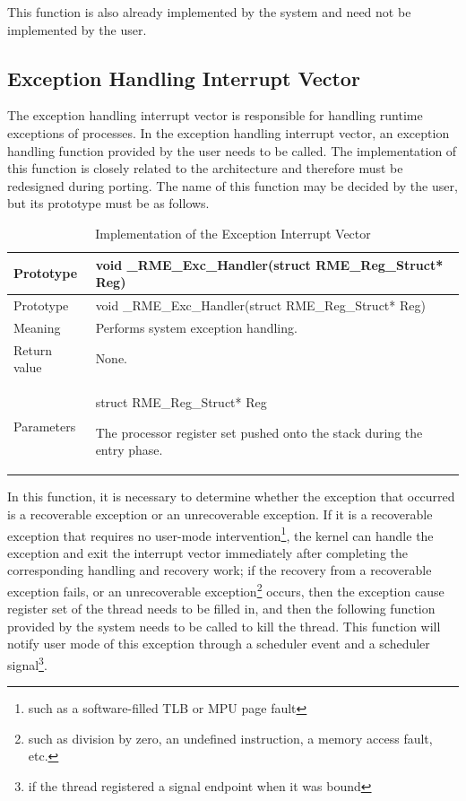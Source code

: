 This function is also already implemented by the system and need not be implemented by the user.

\subsection{Exception Handling Interrupt Vector}\label{subsec:7-exception-handling-interrupt-vector}

The exception handling interrupt vector is responsible for handling runtime exceptions of processes. In the exception handling interrupt vector, an exception handling function provided by the user needs to be called. The implementation of this function is closely related to the architecture and therefore must be redesigned during porting. The name of this function may be decided by the user, but its prototype must be as follows.

\begin{xltabular}{\textwidth}{@{}>{\hsize\raggedright\arraybackslash}X>{\hsize\raggedright\arraybackslash}X@{}}
\caption{Implementation of the Exception Interrupt Vector}\label{tab:7-21-exception-interrupt-vector-implementation}\\
\toprule
Prototype & void \_RME\_Exc\_Handler(struct RME\_Reg\_Struct*
Reg)\tabularnewline
\endfirsthead
\toprule
Prototype & void \_RME\_Exc\_Handler(struct RME\_Reg\_Struct*
Reg)\tabularnewline
\midrule
\endhead
\bottomrule
\endlastfoot
Meaning & Performs system exception handling.\tabularnewline
Return value & None.\tabularnewline
Parameters\strut
 & struct RME\_Reg\_Struct* Reg

The processor register set pushed onto the stack during the entry phase.\strut
\tabularnewline
\end{xltabular}
\nopagebreak[4]

In this function, it is necessary to determine whether the exception that occurred is a recoverable exception or an unrecoverable exception. If it is a recoverable exception that requires no user-mode intervention\footnote{such as a software-filled TLB or MPU page fault}, the kernel can handle the exception and exit the interrupt vector immediately after completing the corresponding handling and recovery work; if the recovery from a recoverable exception fails, or an unrecoverable exception\footnote{such as division by zero, an undefined instruction, a memory access fault, etc.} occurs, then the exception cause register set of the thread needs to be filled in, and then the following function provided by the system needs to be called to kill the thread. This function will notify user mode of this exception through a scheduler event and a scheduler signal\footnote{if the thread registered a signal endpoint when it was bound}.

